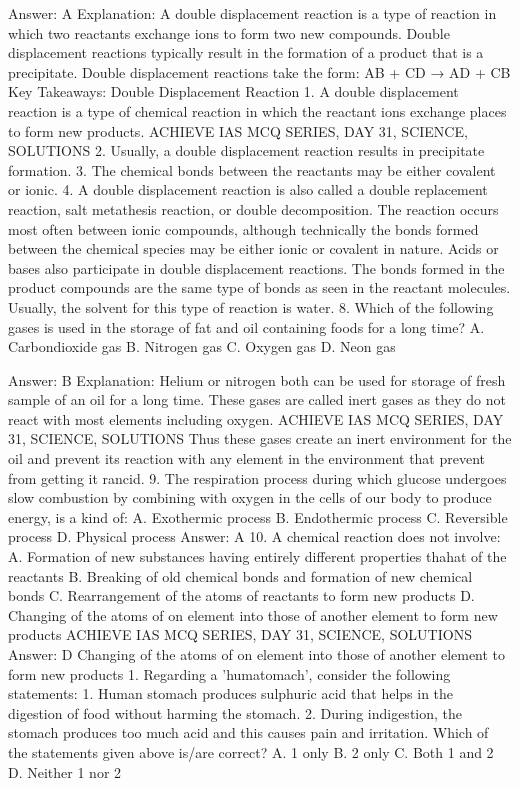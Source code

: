 Answer: A
Explanation: A double displacement reaction is a type of reaction in which two reactants exchange ions to form two new compounds. Double displacement reactions typically result in the formation of a product that is a precipitate. Double displacement reactions take the form: AB + CD → AD + CB Key Takeaways: Double Displacement Reaction 1. A double displacement reaction is a type of chemical reaction in which the reactant ions exchange places to form new products. ACHIEVE IAS MCQ SERIES, DAY 31, SCIENCE, SOLUTIONS 2. Usually, a double displacement reaction results in precipitate formation. 3. The chemical bonds between the reactants may be either covalent or ionic. 4. A double displacement reaction is also called a double replacement reaction, salt metathesis reaction, or double decomposition. The reaction occurs most often between ionic compounds, although technically the bonds formed between the chemical species may be either ionic or covalent in nature. Acids or bases also participate in double displacement reactions. The bonds formed in the product compounds are the same type of bonds as seen in the reactant molecules. Usually, the solvent for this type of reaction is water. 8. Which of the following gases is used in the storage of fat and oil containing foods for a long time? A. Carbondioxide gas B. Nitrogen gas C. Oxygen gas D. Neon gas 

Answer: B
Explanation: Helium or nitrogen both can be used for storage of fresh sample of an oil for a long time. These gases are called inert gases as they do not react with most elements including oxygen. ACHIEVE IAS MCQ SERIES, DAY 31, SCIENCE, SOLUTIONS Thus these gases create an inert environment for the oil and prevent its reaction with any element in the environment that prevent from getting it rancid. 9. The respiration process during which glucose undergoes slow combustion by combining with oxygen in the cells of our body to produce energy, is a kind of: A. Exothermic process B. Endothermic process C. Reversible process D. Physical process 
Answer: A 10. A chemical reaction does not involve: A. Formation of new substances having entirely different 
properties thahat of the reactants B. Breaking of old chemical bonds and formation of new chemical bonds C. Rearrangement of the atoms of reactants to form new products D. Changing of the atoms of on element into those of another element to form new products ACHIEVE IAS MCQ SERIES, DAY 31, SCIENCE, SOLUTIONS 
Answer: D Changing of the atoms of on element into those of another element to form new products 1. Regarding a 
'humatomach', consider the following statements: 1. Human stomach produces sulphuric acid that helps in the digestion of food without harming the stomach. 2. During indigestion, the stomach produces too much acid and this causes pain and irritation. Which of the statements given above is/are correct? A. 1 only B. 2 only C. Both 1 and 2 D. Neither 1 nor 2 

